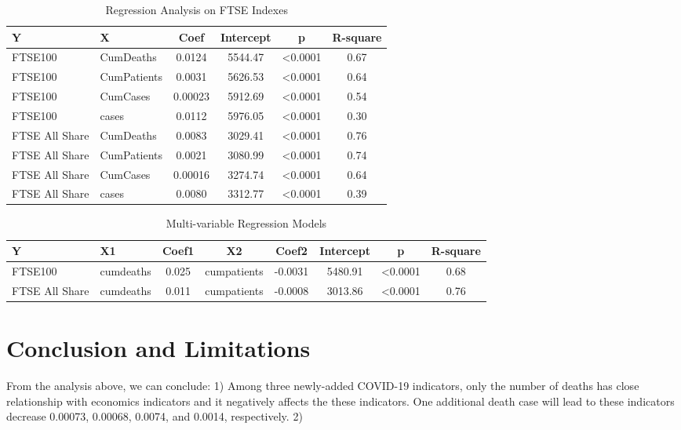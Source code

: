 \documentclass[12pt, a4paper]{report}
\begin{document}
\begin{table}[H]
    \begin{center}
    \caption{Regression Analysis on FTSE Indexes}
    \begin{tabular}{llcccc}
        \toprule
        Y&X&Coef&Intercept&p&R-square\\
        \midrule
        FTSE100&CumDeaths&0.0124&5544.47&<0.0001&0.67\\
        FTSE100&CumPatients&0.0031&5626.53&<0.0001&0.64\\
        FTSE100&CumCases&0.00023&5912.69&<0.0001&0.54\\
        FTSE100&cases&0.0112&5976.05&<0.0001&0.30\\
        FTSE All Share&CumDeaths&0.0083&3029.41&<0.0001&0.76\\
        FTSE All Share&CumPatients&0.0021&3080.99&<0.0001&0.74\\
        FTSE All Share&CumCases&0.00016&3274.74&<0.0001&0.64\\
        FTSE All Share&cases&0.0080&3312.77&<0.0001&0.39\\
        \bottomrule
    \end{tabular}
    \end{center}
\end{table}

\begin{table}[H]
    \begin{center}
    \caption{Multi-variable Regression Models}
    \begin{tabular}{llcccccc}
        \toprule
        Y&X1&Coef1&X2&Coef2&Intercept&p&R-square\\
        \midrule
        FTSE100&cumdeaths&0.025&cumpatients&-0.0031&5480.91&<0.0001&0.68\\
        FTSE All Share&cumdeaths&0.011&cumpatients&-0.0008&3013.86&<0.0001&0.76\\
        \bottomrule
    \end{tabular}
    \end{center}
\end{table}

\section{Conclusion and Limitations}
From the analysis above, we can conclude:
1) Among three newly-added COVID-19 indicators, only the number of deaths has close
relationship with economics indicators and it negatively affects the these indicators.
One additional death case will lead to these indicators decrease 0.00073, 0.00068, 0.0074, and 0.0014, respectively.
2) 

\begin{appendix}
\end{appendix}
\end{document}
